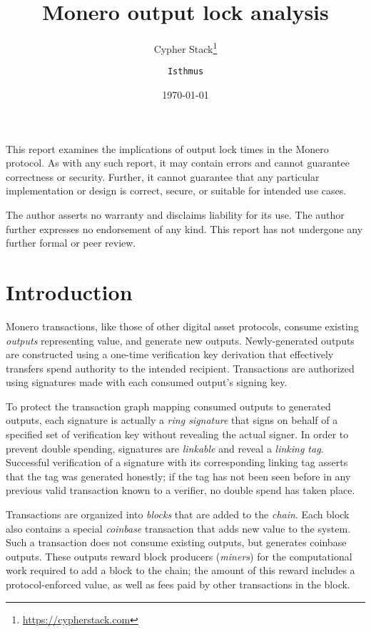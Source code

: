 \documentclass{article}
\title{Monero output lock analysis}
\author{Cypher Stack\thanks{\url{https://cypherstack.com}} \and \texttt{Isthmus}}
\date{\today}
\theoremstyle{definition}
\begin{document}
\maketitle

This report examines the implications of output lock times in the Monero protocol.
As with any such report, it may contain errors and cannot guarantee correctness or security.
Further, it cannot guarantee that any particular implementation or design is correct, secure, or suitable for intended use cases.

The author asserts no warranty and disclaims liability for its use.
The author further expresses no endorsement of any kind.
This report has not undergone any further formal or peer review.


\tableofcontents


\section{Introduction}

Monero transactions, like those of other digital asset protocols, consume existing \textit{outputs} representing value, and generate new outputs.
Newly-generated outputs are constructed using a one-time verification key derivation that effectively transfers spend authority to the intended recipient.
Transactions are authorized using signatures made with each consumed output's signing key.

To protect the transaction graph mapping consumed outputs to generated outputs, each signature is actually a \textit{ring signature} that signs on behalf of a specified set of verification key without revealing the actual signer.
In order to prevent double spending, signatures are \textit{linkable} and reveal a \textit{linking tag}.
Successful verification of a signature with its corresponding linking tag asserts that the tag was generated honestly; if the tag has not been seen before in any previous valid transaction known to a verifier, no double spend has taken place.

Transactions are organized into \textit{blocks} that are added to the \textit{chain}.
Each block also contains a special \textit{coinbase} transaction that adds new value to the system.
Such a transaction does not consume existing outputs, but generates coinbase outputs.
These outputs reward block producers (\textit{miners}) for the computational work required to add a block to the chain; the amount of this reward includes a protocol-enforced value, as well as fees paid by other transactions in the block.
\end{document}
